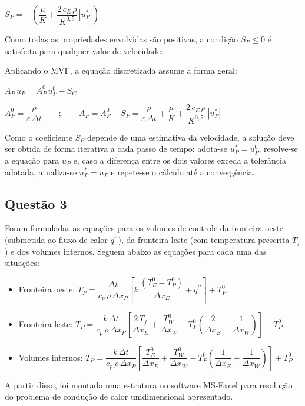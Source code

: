\begin{center}
    $S_{P} = -\left(\dfrac{\mu}{K} + \dfrac{2\,c_{E}\,\rho}{K^{0,5}}\,\left|u_{P}^{*}\right|\right)$
\end{center}

Como todas as propriedades envolvidas são positivas, a condição $S_{P} \le 0$ é satisfeita para qualquer valor de velocidade.

Aplicando o MVF, a equação discretizada assume a forma geral:

\begin{center}
    $A_{P}\,u_{P} = A_{P}^{0}\,u_{P}^{0} + S_{C}$
\end{center}

\begin{center}
    $A_{P}^{0} = \dfrac{\rho}{\varepsilon\,\Delta t} \qquad ; \qquad A_{P} = A_{P}^{0} - S_{P} = \dfrac{\rho}{\varepsilon\,\Delta t} + \dfrac{\mu}{K} + \dfrac{2\,c_{E}\,\rho}{K^{0,5}}\,\left|u_{P}^{*}\right|$
\end{center}

\vspace{0.5cm}

Como o coeficiente $S_{P}$ depende de uma estimativa da velocidade, a solução deve ser obtida de forma iterativa a cada passo de tempo: adota-se $u_{P}^{*} = u_{P}^{0}$, resolve-se a equação para $u_{P}$ e, caso a diferença entre os dois valores exceda a tolerância adotada, atualiza-se $u_{P}^{*} = u_{P}$ e repete-se o cálculo até a convergência.


\subsection*{Questão 3}
Foram formuladas as equações para os volumes de controle da fronteira oeste (submetida ao fluxo de calor $q^{\prime\prime}$), da fronteira leste (com temperatura prescrita $T_{f}$) e dos volumes internos.
Seguem abaixo as equações para cada uma das situações:
\vspace{0.5cm}
    \begin{itemize}
    \item [1 - ]Fronteira oeste: $T_{P} = \dfrac{\Delta t}{c_{p}\,\rho\,\Delta x_{P}} \left[k\,\dfrac{\left(T_E^0 - T_P^0\right)}{\Delta x_{E}} + q^{\prime\prime}\right] + T_P^0$
    \vspace{0.5cm}
    \item [2 - ]Fronteira leste: $T_{P} = \dfrac{k\,\Delta t}{c_{p}\,\rho\,\Delta x_{P}} \left[\dfrac{2\,T_{f}}{\Delta x_E}+\dfrac{T^0_W}{\Delta x_W}-T_P^0\left(\dfrac{2}{\Delta x_{E}}+\dfrac{1}{\Delta x_{W}}\right)\right] + T_P^0$
    \vspace{0.5cm}
    \item [3 - ]Volumes internos: $T_{P} = \dfrac{k\,\Delta t}{c_{p}\,\rho\,\Delta x_{P}} \left[\dfrac{T_{E}^0}{\Delta x_E}+\dfrac{T^0_W}{\Delta x_W}-T_P^0\left(\dfrac{1}{\Delta x_{E}}+\dfrac{1}{\Delta x_{W}}\right)\right] + T_P^0$
    \end{itemize}
\vspace{0.5cm}
    A partir disso, foi montada uma estrutura no software MS-Excel para resolução do problema de condução de calor unidimensional apresentado.

